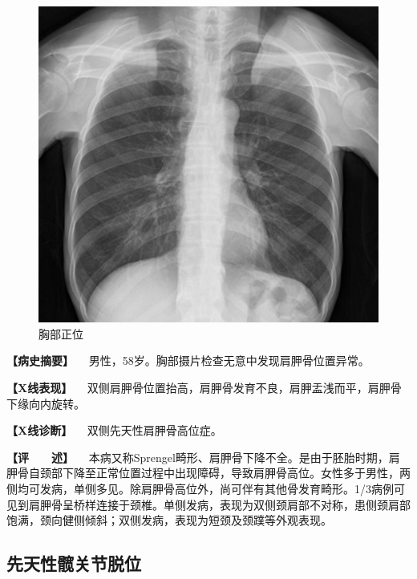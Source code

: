 \begin{figure}[!htbp]
 \centering
 \includegraphics{./images/Image00019.jpg}
 \captionsetup{justification=centering}
 \caption{胸部正位}
 \label{fig2-2-3}
  \end{figure} 

\textbf{【病史摘要】}
　男性，58岁。胸部摄片检查无意中发现肩胛骨位置异常。

\textbf{【X线表现】}
　双侧肩胛骨位置抬高，肩胛骨发育不良，肩胛盂浅而平，肩胛骨下缘向内旋转。

\textbf{【X线诊断】} 　双侧先天性肩胛骨高位症。

\textbf{【评　　述】}
　本病又称Sprengel畸形、肩胛骨下降不全。是由于胚胎时期，肩胛骨自颈部下降至正常位置过程中出现障碍，导致肩胛骨高位。女性多于男性，两侧均可发病，单侧多见。除肩胛骨高位外，尚可伴有其他骨发育畸形。1/3病例可见到肩胛骨呈桥样连接于颈椎。单侧发病，表现为双侧颈肩部不对称，患侧颈肩部饱满，颈向健侧倾斜；双侧发病，表现为短颈及颈蹼等外观表现。

\subsection{先天性髋关节脱位}

